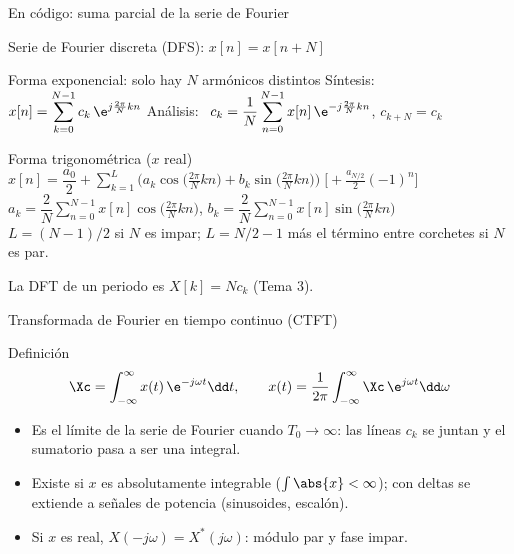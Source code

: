 \documentclass[aspectratio=169,11pt]{beamer}
\begin{document}
\begin{frame}{En código: suma parcial de la serie de Fourier}
\end{frame}

\begin{frame}{Serie de Fourier discreta (DFS): $x[n]=x[n+N]$}
  \small
  \begin{block}{Forma exponencial: solo hay $N$ armónicos distintos}
    Síntesis: \ $x[n]=\displaystyle\sum_{k=0}^{N-1}c_k\,\e^{j\frac{2\pi}{N}kn}$
    \qquad
    Análisis: \ $c_k=\displaystyle\frac{1}{N}\sum_{n=0}^{N-1}x[n]\,\e^{-j\frac{2\pi}{N}kn}$,
    \quad $c_{k+N}=c_k$
  \end{block}
  \begin{block}{Forma trigonométrica ($x$ real)}
    $x[n]=\dfrac{a_0}{2}+\displaystyle\sum_{k=1}^{L}\Big(a_k\cos\big(\tfrac{2\pi}{N}kn\big)+b_k\sin\big(\tfrac{2\pi}{N}kn\big)\Big)\;\Big[+\tfrac{a_{N/2}}{2}(-1)^n\Big]$\\[2mm]
    $a_k=\dfrac{2}{N}\displaystyle\sum_{n=0}^{N-1}x[n]\cos\big(\tfrac{2\pi}{N}kn\big)$, \quad
    $b_k=\dfrac{2}{N}\displaystyle\sum_{n=0}^{N-1}x[n]\sin\big(\tfrac{2\pi}{N}kn\big)$\\[1mm]
    {\small $L=(N-1)/2$ si $N$ es impar; $L=N/2-1$ más el término entre corchetes si $N$ es par.}
  \end{block}
  {\footnotesize\color{pdsgris}La DFT de un periodo es $X[k]=N c_k$ (Tema 3).}
\end{frame}

\begin{frame}{Transformada de Fourier en tiempo continuo (CTFT)}
  \begin{block}{Definición}
    \[
      \Xc=\int_{-\infty}^{\infty}x(t)\,\e^{-j\omega t}\dd t,
      \qquad
      x(t)=\frac{1}{2\pi}\int_{-\infty}^{\infty}\Xc\,\e^{j\omega t}\dd\omega
    \]
  \end{block}
  \begin{itemize}\small
    \item Es el límite de la serie de Fourier cuando $T_0\to\infty$: las líneas $c_k$ se juntan y el sumatorio pasa a ser una integral.
    \item Existe si $x$ es absolutamente integrable ($\int\abs{x}<\infty$); con deltas se extiende a señales de potencia (sinusoides, escalón).
    \item Si $x$ es real, $X(-j\omega)=X^*(j\omega)$: módulo par y fase impar.
  \end{itemize}
\end{frame}
\end{document}
